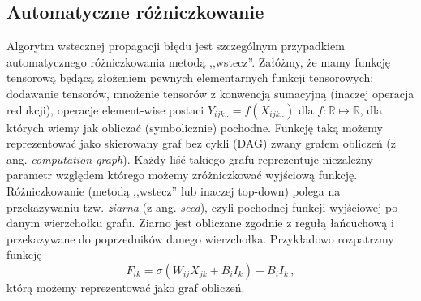 \documentclass{myclass}
\begin{document}
\subsection{Automatyczne różniczkowanie}

Algorytm wstecznej propagacji błędu jest szczególnym przypadkiem automatycznego różniczkowania metodą
,,wstecz''. Załóżmy, że mamy funkcję tensorową będącą złożeniem pewnych elementarnych funkcji
tensorowych: dodawanie tensorów, mnożenie tensorów z konwencją sumacyjną (inaczej operacja
redukcji), operacje element-wise postaci \(Y_{ijk..} = f(X_{ijk..})\) dla
\(f:\mathbb{R}\mapsto\mathbb{R}\), dla których wiemy jak obliczać (symbolicznie) pochodne. Funkcję
taką możemy reprezentować jako skierowany graf bez cykli (DAG) zwany grafem obliczeń (z ang.
\textit{computation graph}). Każdy liść takiego grafu reprezentuje niezależny parametr względem
którego możemy zróżniczkować wyjściową funkcję. Różniczkowanie (metodą ,,wstecz'' lub inaczej
top-down) polega na przekazywaniu tzw. \textit{ziarna} (z ang. \textit{seed}), czyli pochodnej
funkcji wyjściowej po danym wierzchołku grafu. Ziarno jest obliczane zgodnie z regułą łańcuchową i
przekazywane do poprzedników danego wierzchołka. Przykładowo rozpatrzmy funkcję
\begin{equation*}
    F_{ik} = \sigma\left(W_{ij}X_{jk} + B_{i}I_k\right) + B_{i}I_{k}\,,
\end{equation*}
którą możemy reprezentować jako graf obliczeń.
\end{document}
